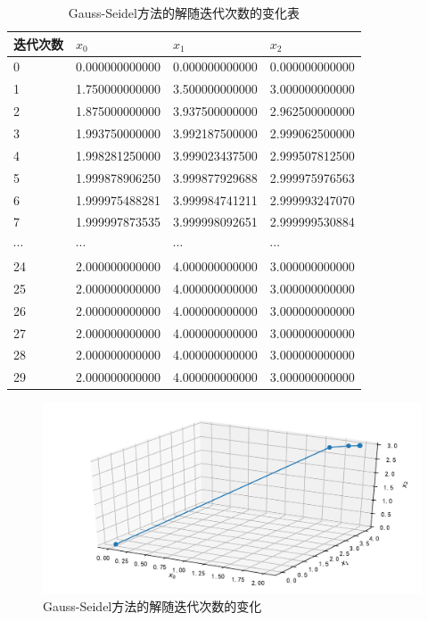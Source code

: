 \begin{table}[H]
	\centering
	\caption{Gauss-Seidel方法的解随迭代次数的变化表}
	\begin{tabular}{llll}
		\hline
		迭代次数 & $x_0$          & $x_1$          & $x_2$          \\ \hline
0    & 0.000000000000 & 0.000000000000 & 0.000000000000 \\
1    & 1.750000000000 & 3.500000000000 & 3.000000000000 \\
2    & 1.875000000000 & 3.937500000000 & 2.962500000000 \\
3    & 1.993750000000 & 3.992187500000 & 2.999062500000 \\
4    & 1.998281250000 & 3.999023437500 & 2.999507812500 \\
5    & 1.999878906250 & 3.999877929688 & 2.999975976563 \\
6    & 1.999975488281 & 3.999984741211 & 2.999993247070 \\
7    & 1.999997873535 & 3.999998092651 & 2.999999530884 \\
$\cdots$ & $\cdots$  & $\cdots$  & $\cdots$ \\
24   & 2.000000000000 & 4.000000000000 & 3.000000000000 \\
25   & 2.000000000000 & 4.000000000000 & 3.000000000000 \\
26   & 2.000000000000 & 4.000000000000 & 3.000000000000 \\
27   & 2.000000000000 & 4.000000000000 & 3.000000000000 \\
28   & 2.000000000000 & 4.000000000000 & 3.000000000000 \\
29   & 2.000000000000 & 4.000000000000 & 3.000000000000 \\ \hline
	\end{tabular}
\end{table}

\begin{figure}[H]
	\centering
	\caption{Gauss-Seidel方法的解随迭代次数的变化}
	\includegraphics[width=\linewidth]{fig15.pdf}
\end{figure}

